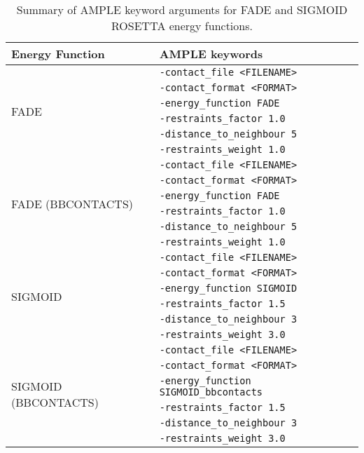 \begin{table}[H]
    \centering
	\caption{Summary of AMPLE keyword arguments for FADE and SIGMOID ROSETTA energy functions.}
    \label{table:ample_predictors_kwargs}
    \begin{tabularx}{\textwidth}{ X X }
        \hline
        \textbf{Energy Function} & \textbf{AMPLE keywords} \\
        \hline
        \multirow{6}{1em}{FADE} & \texttt{-contact\_file <FILENAME>} \\
                                & \texttt{-contact\_format <FORMAT>} \\
                                & \texttt{-energy\_function FADE} \\
                                & \texttt{-restraints\_factor 1.0} \\
                                & \texttt{-distance\_to\_neighbour 5} \\
                                & \texttt{-restraints\_weight 1.0} \\
        \hline
        \multirow{6}{1em}{FADE (BBCONTACTS)} & \texttt{-contact\_file <FILENAME>} \\
                                & \texttt{-contact\_format <FORMAT>} \\
                                & \texttt{-energy\_function FADE} \\
                                & \texttt{-restraints\_factor 1.0} \\
                                & \texttt{-distance\_to\_neighbour 5} \\
                                & \texttt{-restraints\_weight 1.0} \\
        \hline
        \multirow{6}{1em}{SIGMOID} & \texttt{-contact\_file <FILENAME>} \\
                                & \texttt{-contact\_format <FORMAT>} \\
                                & \texttt{-energy\_function SIGMOID} \\
                                & \texttt{-restraints\_factor 1.5} \\
                                & \texttt{-distance\_to\_neighbour 3} \\
                                & \texttt{-restraints\_weight 3.0} \\
        \hline
        \multirow{6}{1em}{SIGMOID (BBCONTACTS)} & \texttt{-contact\_file <FILENAME>} \\
                                & \texttt{-contact\_format <FORMAT>} \\
                                & \texttt{-energy\_function SIGMOID\_bbcontacts} \\
                                & \texttt{-restraints\_factor 1.5} \\
                                & \texttt{-distance\_to\_neighbour 3} \\
                                & \texttt{-restraints\_weight 3.0} \\
        \hline
    \end{tabularx}
\end{table}

